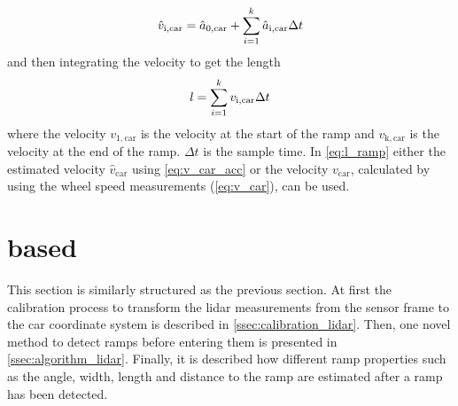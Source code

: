 \begin{equation}
	\label{eq:v_car_acc}
	\hat{v}_\mathrm{i, car} = \hat{a}_\mathrm{0, car} + \sum_{i = 1}^k \hat{a}_\mathrm{i, car} \Delta t                         \\
\end{equation}
and then integrating the velocity to get the length
\begin{equation}
	\label{eq:l_ramp}
	l = \sum_{i = 1}^k v_\mathrm{i, car} \Delta t                         \\
\end{equation}
where the velocity $v_\mathrm{1, car}$ is the velocity at the start of the ramp and $v_\mathrm{k, car}$ is the velocity at the end of the ramp.
$\Delta t$ is the sample time.
In \cref{eq:l_ramp} either the estimated velocity $\hat{v}_\mathrm{car}$ using \cref{eq:v_car_acc} or the velocity ${v}_\mathrm{car}$, calculated by using the wheel speed measurements (\cref{eq:v_car}), can be used.


\section{ based}
\label{sec:methods_lidar}
This section is similarly structured as the previous section.
At first the calibration process to transform the \gls{lidar} measurements from the sensor frame to the car coordinate system is described in \cref{ssec:calibration_lidar}.
Then, one novel method to detect ramps before entering them is presented in \cref{ssec:algorithm_lidar}.
Finally, it is described how different ramp properties such as the angle, width, length and distance to the ramp are estimated after a ramp has been detected.

